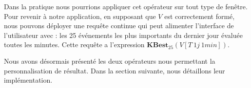 Dans la pratique nous pourrions appliquer cet opérateur sur tout type de fenêtre. Pour revenir à notre application, en supposant que $V$ est correctement formé, nous pouvons déployer une requête continue qui peut alimenter l'interface de l'utilisateur avec : les 25 événements les plus importants du dernier jour évaluée toutes les minutes. Cette requête a l'expression $\textbf{KBest}_{25}(V[T\ 1j\ 1min])$.

Nous avons désormais présenté les deux opérateurs nous permettant la personnalisation de résultat. Dans la section suivante, nous détaillons leur implémentation.

